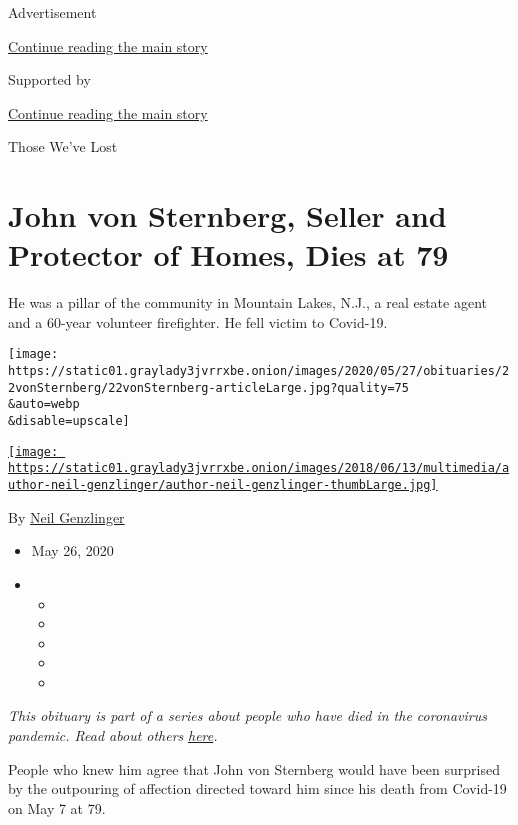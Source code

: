 Advertisement

\protect\hyperlink{after-top}{Continue reading the main story}

Supported by

\protect\hyperlink{after-sponsor}{Continue reading the main story}

Those We've Lost

\hypertarget{john-von-sternberg-seller-and-protector-of-homes-dies-at-79}{%
\section{John von Sternberg, Seller and Protector of Homes, Dies at
79}\label{john-von-sternberg-seller-and-protector-of-homes-dies-at-79}}

He was a pillar of the community in Mountain Lakes, N.J., a real estate
agent and a 60-year volunteer firefighter. He fell victim to Covid-19.

\texttt{[image: https://static01.graylady3jvrrxbe.onion/images/2020/05/27/obituaries/22vonSternberg/22vonSternberg-articleLarge.jpg?quality=75\\\&auto=webp\\\&disable=upscale]}

\href{https://www.nytimes3xbfgragh.onion/by/neil-genzlinger}{\texttt{[image: https://static01.graylady3jvrrxbe.onion/images/2018/06/13/multimedia/author-neil-genzlinger/author-neil-genzlinger-thumbLarge.jpg]}}

By \href{https://www.nytimes3xbfgragh.onion/by/neil-genzlinger}{Neil
Genzlinger}

\begin{itemize}
\item
  May 26, 2020
\item
  \begin{itemize}
  \item
  \item
  \item
  \item
  \item
  \end{itemize}
\end{itemize}

\emph{This obituary is part of a series about people who have died in
the coronavirus pandemic. Read about others}
\href{https://www.nytimes3xbfgragh.onion/series/people-who-have-died-of-the-coronavirus}{\emph{here}}\emph{.}

People who knew him agree that John von Sternberg would have been
surprised by the outpouring of affection directed toward him since his
death from Covid-19 on May 7 at 79.

